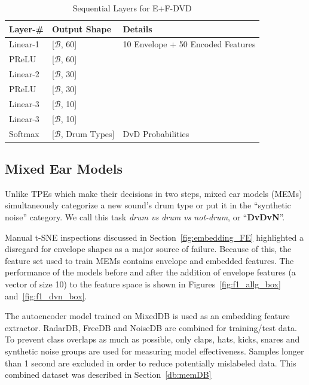 \documentclass[\main/thesis.tex]{subfiles}
\begin{document}
\begin{center}
    \begin{table}[tbp]
    \centering
    \begin{tabular}{|p{33mm}|p{33mm}|p{50mm}|}
    \hline
    Layer-\# & Output Shape &  Details  \\ \hline
    Linear-1 & [$\mathcal{B}$, 60] &   10 Envelope + 50 Encoded Features \\ \hline
    PReLU & [$\mathcal{B}$, 60] &  \\ \hline
    Linear-2 & [$\mathcal{B}$, 30] & \\ \hline
    PReLU & [$\mathcal{B}$, 30] &  \\ \hline 
    Linear-3 & [$\mathcal{B}$, 10] &  \\ \hline %
    Linear-3 & [$\mathcal{B}$, 10] &  \\ \hline 
    Softmax & [$\mathcal{B}$, Drum Types] &  DvD Probabilities\\ \hline
    \end{tabular}
    \caption{Sequential Layers for E+F-DVD}
    \label{tab:dvd:EF}
\end{table}
\end{center}


\subsection{Mixed Ear Models}
\label{chap3:mixed_ear_models}
Unlike TPEs which make their decisions in two steps, mixed ear models (MEMs) simultaneously categorize a new sound's drum type or put it in the \enquote{synthetic noise} category. We call this task \textit{drum vs drum vs not-drum}, or \enquote{\textbf{DvDvN}}.

Manual t-SNE inspections discussed in Section~\ref{fig:embedding_FE} highlighted a disregard for envelope shapes as a major source of failure. Because of this, the feature set used to train MEMs contains envelope and embedded features. The performance of the models before and after the addition of envelope features (a vector of size 10) to the feature space is shown in Figures~\ref{fig:f1_allg_box} and~\ref{fig:f1_dvn_box}.

The autoencoder model trained on MixedDB is used as an embedding feature extractor. RadarDB, FreeDB and NoiseDB are combined for training/test data. To prevent class overlaps as much as possible, only claps, hats, kicks, snares and synthetic noise groups are used for measuring model effectiveness. Samples longer than 1 second are excluded in order to reduce potentially mislabeled data. This combined dataset was described in Section~\ref{db:memDB}
\end{document}
